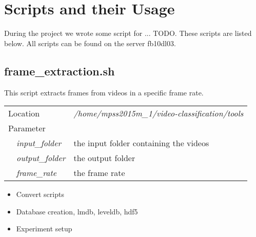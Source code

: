 \section{Scripts and their Usage}
\label{sec:scripts}

During the project we wrote some script for ... TODO.
These scripts are listed below.
All scripts can be found on the server fb10dl03.

\subsection{frame\_extraction.sh}
This script extracts frames from videos in a specific frame rate.

\begin{table}[ht]
\begin{tabular}{lll}
\multicolumn{2}{l}{Location}  & \textit{/home/mpss2015m\_1/video-classification/tools} \\
\multicolumn{2}{l}{Parameter} &                                        \\
        & \textit{input\_folder}       & the input folder containing the videos \\
        & \textit{output\_folder}      & the output folder                      \\
        & \textit{frame\_rate}         & the frame rate
\end{tabular}
\end{table}



\begin{itemize}
	\item Convert scripts
	\item Database creation, lmdb, leveldb, hdf5
	\item Experiment setup
\end{itemize}